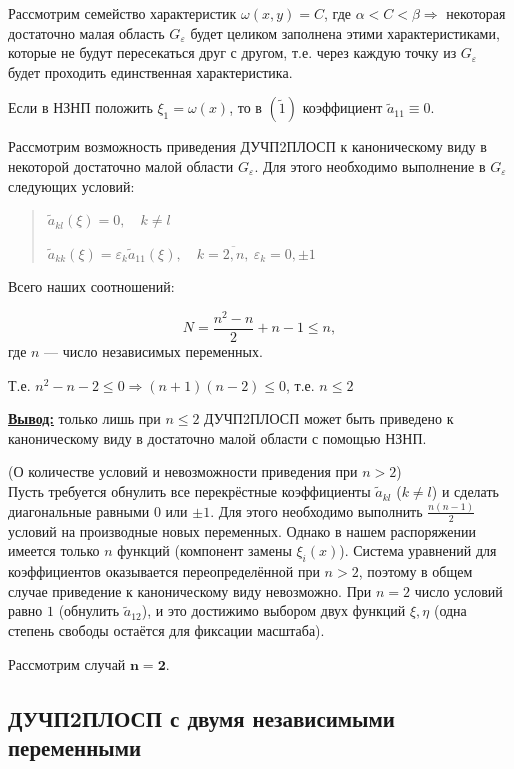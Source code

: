 Рассмотрим семейство характеристик $\omega(x, y)=C$, где $\alpha < C < \beta \Rightarrow$ некоторая достаточно малая область $G_\varepsilon$ будет целиком заполнена этими характеристиками, которые не будут пересекаться друг с другом, т.е. через каждую точку из $G_\varepsilon$ будет проходить единственная характеристика.

Если в НЗНП положить $\xi_1=\omega(x)$, то в $(\widetilde{1})$ коэффициент $\tilde a_{11} \equiv 0$.

Рассмотрим возможность приведения ДУЧП2ПЛОСП к каноническому виду в некоторой достаточно малой области $G_\varepsilon$. Для этого необходимо выполнение в $G_\varepsilon$ следующих условий:

\begin{quote}
	$\tilde a_{kl}(\xi)=0,\quad k \neq l$

	$\tilde a_{kk}(\xi)=\varepsilon_k\tilde a_{11}(\xi),\quad k=\overline{2, n},\ \varepsilon_k=0,\pm1$
\end{quote}

Всего наших соотношений:

\[
	N=\frac{n^2-n}{2}+n-1 \leq n,
\]
где $n$ --- число независимых переменных.

Т.е. $n^2-n-2 \leq 0 \Rightarrow (n+1)(n-2) \leq0$, т.е. $n\leq2$

\textbf{\underline{Вывод:}} только лишь при $n \leq 2$ ДУЧП2ПЛОСП может быть приведено к каноническому виду в достаточно малой области с помощью НЗНП.

\begin{note}(О количестве условий и невозможности приведения при $n>2$)\\
	Пусть требуется обнулить все перекрёстные коэффициенты $\tilde a_{kl}$ ($k\ne l$) и сделать диагональные равными $0$ или $\pm1$.
	Для этого необходимо выполнить $\frac{n(n-1)}{2}$ условий на производные новых переменных.
	Однако в нашем распоряжении имеется только $n$ функций (компонент замены $\xi_i(x)$).
	Система уравнений для коэффициентов оказывается переопределённой при $n>2$, поэтому в общем случае приведение к каноническому виду невозможно.
	При $n=2$ число условий равно $1$ (обнулить $\tilde a_{12}$), и это достижимо выбором двух функций $\xi,\eta$ (одна степень свободы остаётся для фиксации масштаба).
\end{note}

Рассмотрим случай $\boldsymbol{n=2}$.

\subsection{ДУЧП2ПЛОСП с двумя независимыми переменными}


